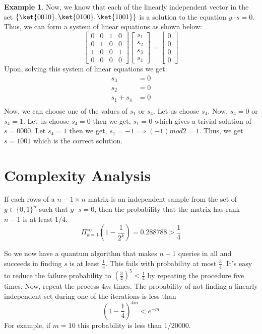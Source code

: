 \documentclass[12pt, oneside]{book}
\theoremstyle{definition}
\theoremstyle{definition}
\newtheorem{example}{Example}[section]
\theoremstyle{remark}
\begin{document}
\begin{example}
    Now, we know that each of the linearly independent vector in the set $\{\ket{0010},\ket{0100},\ket{1001}\}$ is a solution to the equation $y\cdot s=0$. Thus, we can form a system of linear equations as shown below:
    \[
    \begin{bmatrix}
        0 & 0 & 1 & 0 \\
        0 & 1 & 0 & 0 \\
        1 & 0 & 0 & 1 \\
        0 & 0 & 0 & 0
    \end{bmatrix}
    \begin{bmatrix}
        s_1 \\
        s_2 \\
        s_3 \\
        s_4 
    \end{bmatrix}
    =
    \begin{bmatrix}
        0 \\
        0 \\
        0 \\
        0
    \end{bmatrix}
    \]
    Upon, solving this system of linear equations we get:
    \begin{align*}
    s_3&=0 \\
    s_2&=0 \\
    s_1 + s_4 &=0 \\
    \end{align*}
    Now, we can choose one of the values of $s_1$ or $s_4$. Let us choose $s_4$.
    Now, $s_4=0$ or $s_4=1$. 
    Let us choose $s_4=0$ then we get, $s_1=0$ which gives a trivial solution of $s=0000$. Let $s_4=1$ then we get, $s_1=-1\implies (-1) mod 2=1$.
    Thus, we get $s=1001$ which is the correct solution.
\end{example}
\section{Complexity Analysis}
If each rows of a $n-1 \times n$ matrix is an independent sample from the set of $y\in\{0,1\}^n$ such that $y\cdot s=0$, then the probability that the matrix has rank $n-1$ is at least $1/4$.
\[
\Pi_{k=1}^{\infty} \left(1-\frac{1}{2^k}\right) = 0.288788 > \frac{1}{4}
\]

So we now have a quantum algorithm that makes $n-1$ queries in all and succeeds in finding $s$ is at least $\frac{1}{4}$. This fails with probability at most $\frac{3}{4}$. It's easy to reduce the failure probability to $\left(\frac{3}{4}\right)^5<\frac{1}{4}$ by repeating the procedure five times. Now, repeat the process $4m$ times. The probability of not finding a linearly independent set during one of the iterations is less than
\[
\left(1-\frac{1}{4}\right)^{4m} < e^{-m}
\]
For example, if $m=10$ this probability is less than $1/20000$.
\end{document}
